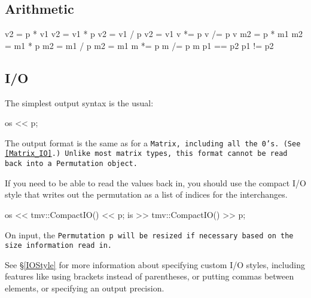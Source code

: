 \subsection{Arithmetic}
\label{Permutation_Arithmetic}

\begin{tmvcode}
v2 = p * v1
v2 = v1 * p
v2 = v1 / p
v2 = v1 %
v *= p
v /= p
v %
m2 = p * m1
m2 = m1 * p
m2 = m1 / p
m2 = m1 %
m *= p
m /= p
m %
p1 == p2
p1 != p2
\end{tmvcode}

\subsection{I/O}
\label{Permutation_IO}

The simplest output syntax is the usual:
\begin{tmvcode}
os << p;
\end{tmvcode}
The output format is the same as for a \tt{Matrix}, including all the 0's.
(See \ref{Matrix_IO}.)  Unlike most matrix types, this format cannot be read back into a
\tt{Permutation} object.  

If you need to be able to read the values back in, you should use the compact I/O style that writes out the permutation as a list of indices for the interchanges.
\begin{tmvcode}
os << tmv::CompactIO() << p;
is >> tmv::CompactIO() >> p;
\end{tmvcode}
On input, the \tt{Permutation p} will be resized if necessary based on the size information read in.

See \S\ref{IOStyle} for more information about specifying custom I/O styles, including
features like using brackets instead of parentheses, or putting commas between elements,
or specifying an output precision.  
